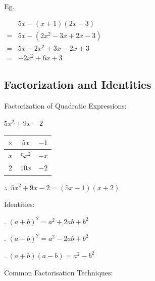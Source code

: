 \documentclass[twocolumn]{article}
\begin{document}
\noindent
Eg.

\noindent
$
\begin{aligned}
	& 5 x-(x+1)(2 x-3) \\
	= & 5 x-\left(2 x^2-3 x+2 x-3\right) \\
	= & 5 x-2 x^2+3 x-2 x+3 \\
	= & -2 x^2+6 x+3
\end{aligned}
$

\subsection*{Factorization and Identities}

\noindent
Factorization of Quadratic Expressions:

\noindent
$
5 x^2+9 x-2
$

\begin{tabular}{c|c|c|}
	$\times$ & \multicolumn{1}{|c}{$5 x$} & $-1$ \\
	\hline$x$ & $5 x^2$ & $-x$ \\
	\cline { 2 - 3 } $2$ & $10 x$ & $-2$ \\
	\hline 
\end{tabular}

\noindent 
$
\therefore \ \ 5 x^2+9 x-2=(5 x-1)(x+2)
$

\bigskip 

\noindent 
Identities:

\bigskip 

. $(a+b)^2=a^2+2 a b+b^2$

. $(a-b)^2=a^2-2 a b+b^2$

. $(a+b)(a-b)=a^2-b^2$

\bigskip 

\noindent 
Common Factorisation Techniques:
\end{document}
